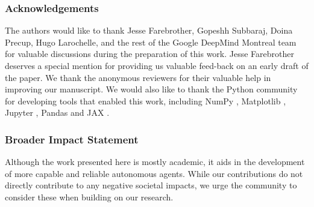 \subsubsection*{Acknowledgements}

The authors would like to thank Jesse Farebrother, Gopeshh Subbaraj, Doina Precup, Hugo Larochelle, and the rest of the Google DeepMind Montreal team for valuable discussions during the preparation of this work.  Jesse Farebrother deserves a special mention for providing us valuable feed-back on an early draft of the paper. We thank the anonymous reviewers for their valuable help in improving our manuscript. We would also like to thank the Python community \cite{van1995python, 4160250} for developing tools that enabled this work, including NumPy \cite{harris2020array}, Matplotlib \cite{hunter2007matplotlib}, Jupyter \cite{2016ppap}, Pandas \cite{McKinney2013Python} and JAX \cite{bradbury2018jax}.

\subsubsection*{Broader Impact Statement}

Although the work presented here is mostly academic, it aids in the development of more capable and reliable autonomous agents. While our contributions do not directly contribute to any negative societal impacts, we urge the community to consider these when building on our research.